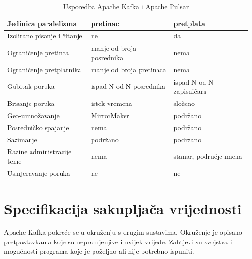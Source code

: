 \documentclass[utf8, diplomski, lmodern, numeric]{fer}
\begin{document}
\begin{table}[H]
\begin{adjustwidth}{-15mm}{15mm}
\begin{tabular}{|l|l|l|}
Jedinica paralelizma        & pretinac                      & pretplata                                      \\ \hline
Izolirano pisanje i čitanje & ne                            & da                                             \\ \hline
Ograničenje pretinca        & manje od broja posrednika     & nema                                           \\ \hline
Ograničenje pretplatnika    & manje od broja pretinaca      & nema                                           \\ \hline
Gubitak poruka              & ispad N od N posrednika       & ispad N od N zapisničara                       \\ \hline
Brisanje poruka             & istek vremena                 & složeno                                        \\ \hline
Geo-umnožavanje             & MirrorMaker                   & podržano                                       \\ \hline
Posredničko spajanje        & nema                          & podržano                                       \\ \hline
Sažimanje                   & podržano                      & podržano                                       \\ \hline
Razine administracije teme  & nema                          & stanar, područje imena                         \\ \hline
Usmjeravanje poruka         & ne                            & ne                                             \\ \hline
\end{tabular}

\end{adjustwidth}
 
\caption{Usporedba Apache Kafka i Apache Pulsar}
\label{table:kafka_pulsar}

\end{table}



\chapter{Specifikacija sakupljača vrijednosti}

Apache Kafka pokreće se u okruženju s drugim sustavima. Okruženje je opisano pretpostavkama koje su nepromjenjive i uvijek vrijede. Zahtjevi su svojstva i mogućnosti programa koje je poželjno ali nije potrebno ispuniti.
\end{document}
